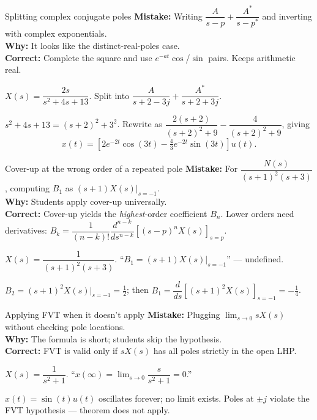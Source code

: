 \documentclass[11pt]{article}
\begin{document}
\begin{pitfallbox}{Splitting complex conjugate poles}
\textbf{Mistake:} Writing $\dfrac{A}{s-p} + \dfrac{A^*}{s-p^*}$ and inverting with complex exponentials.\\
\textbf{Why:} It looks like the distinct-real-poles case.\\
\textbf{Correct:} Complete the square and use $e^{-at}\cos$/$\sin$ pairs. Keeps arithmetic real.
\begin{wrongbox}
$X(s) = \dfrac{2s}{s^2+4s+13}$. Split into $\dfrac{A}{s+2-3j} + \dfrac{A^*}{s+2+3j}$.
\end{wrongbox}
\begin{rightbox}
$s^2+4s+13 = (s+2)^2 + 3^2$. Rewrite as
$\dfrac{2(s+2)}{(s+2)^2+9} - \dfrac{4}{(s+2)^2+9}$, giving
$$x(t) = \left[ 2 e^{-2t} \cos(3t) - \tfrac{4}{3} e^{-2t}\sin(3t)\right] u(t).$$
\end{rightbox}
\end{pitfallbox}

\begin{pitfallbox}{Cover-up at the wrong order of a repeated pole}
\textbf{Mistake:} For $\dfrac{N(s)}{(s+1)^2(s+3)}$, computing $B_1$ as $(s+1)X(s)|_{s=-1}$.\\
\textbf{Why:} Students apply cover-up universally.\\
\textbf{Correct:} Cover-up yields the \emph{highest}-order coefficient $B_n$. Lower orders need derivatives:
$B_k = \dfrac{1}{(n-k)!}\dfrac{d^{n-k}}{ds^{n-k}}\left[(s-p)^n X(s)\right]_{s=p}$.
\begin{wrongbox}
$X(s) = \dfrac{1}{(s+1)^2(s+3)}$. ``$B_1 = (s+1)X(s)|_{s=-1}$'' --- undefined.
\end{wrongbox}
\begin{rightbox}
$B_2 = (s+1)^2 X(s)|_{s=-1} = \tfrac{1}{2}$; then $B_1 = \dfrac{d}{ds}\left[(s+1)^2 X(s)\right]_{s=-1} = -\tfrac{1}{4}$.
\end{rightbox}
\end{pitfallbox}

\begin{pitfallbox}{Applying FVT when it doesn't apply}
\textbf{Mistake:} Plugging $\lim_{s\to 0} sX(s)$ without checking pole locations.\\
\textbf{Why:} The formula is short; students skip the hypothesis.\\
\textbf{Correct:} FVT is valid only if $sX(s)$ has all poles strictly in the open LHP.
\begin{wrongbox}
$X(s) = \dfrac{1}{s^2+1}$. ``$x(\infty) = \lim_{s\to 0}\dfrac{s}{s^2+1}=0$.''
\end{wrongbox}
\begin{rightbox}
$x(t) = \sin(t)u(t)$ oscillates forever; no limit exists. Poles at $\pm j$ violate the FVT hypothesis --- theorem does not apply.
\end{rightbox}
\end{pitfallbox}
\end{document}
